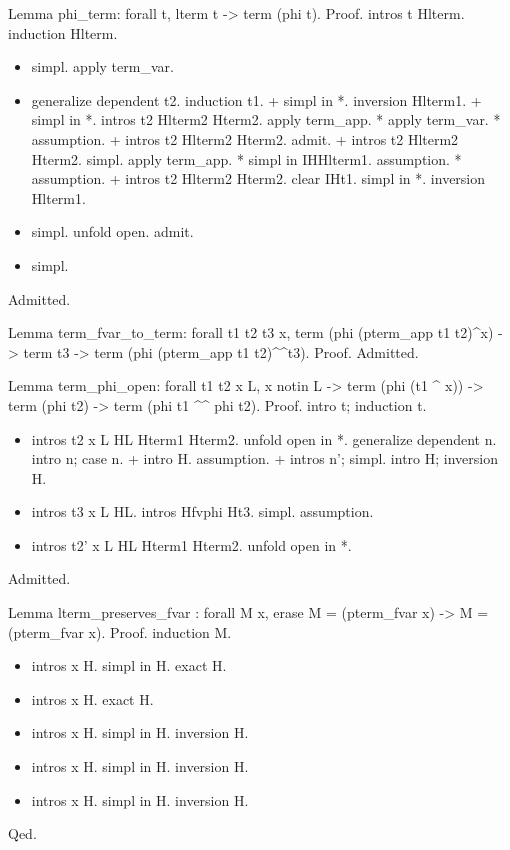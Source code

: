 Lemma phi\_term: forall t, lterm t -> term (phi t).
Proof.
  intros t Hlterm.
  induction Hlterm.

\begin{itemize}
\item  simpl.
    apply term\_var. 

\item  generalize dependent t2.
    induction t1.
    + simpl in *.
      inversion Hlterm1.
    + simpl in *.
      intros t2 Hlterm2 Hterm2.
      apply term\_app.
        * apply term\_var.
        * assumption. 
    + intros t2 Hlterm2 Hterm2.
      admit.
    + intros t2 Hlterm2 Hterm2.
      simpl.
      apply term\_app.
        * simpl in IHHlterm1.
          assumption.
        * assumption. 
    + intros t2 Hlterm2 Hterm2.
      clear IHt1.
      simpl in *.
      inversion Hlterm1.

\item  simpl.    
    unfold open.
    admit.

\item  simpl.

\end{itemize}
Admitted.


Lemma term\_fvar\_to\_term: forall t1 t2 t3 x, term (phi (pterm\_app t1 t2)\^{}x) -> term t3 -> term (phi (pterm\_app t1 t2)\^{}\^{}t3). 
Proof.
Admitted.  


Lemma term\_phi\_open: forall t1 t2 x L,  x notin L -> term (phi (t1 \^{} x)) -> term (phi t2) -> term (phi t1 \^{}\^{} phi t2).
Proof.
  intro t; induction t.

\begin{itemize}
\item  intros t2 x L HL Hterm1 Hterm2.
    unfold open in *.
    generalize dependent n.
    intro n; case n.
    + intro H.
      assumption.
    + intros n'; simpl.
      intro H; inversion H.

\item  intros t3 x L HL.
    intros Hfvphi Ht3.
    simpl.
    assumption.

\item  intros t2' x L HL Hterm1 Hterm2.
    unfold open in *.
   
\end{itemize}
Admitted.
  



Lemma lterm\_preserves\_fvar : forall M x, erase M = (pterm\_fvar x) -> M = (pterm\_fvar x).
Proof.
  induction M.

\begin{itemize}
\item  intros x H.
    simpl in H.
    exact H.

\item  intros x H.
    exact H.

\item  intros x H.
    simpl in H.
    inversion H.

\item  intros x H.
    simpl in H.
    inversion H.

\item  intros x H.
    simpl in H.
    inversion H.

\end{itemize}
Qed.


